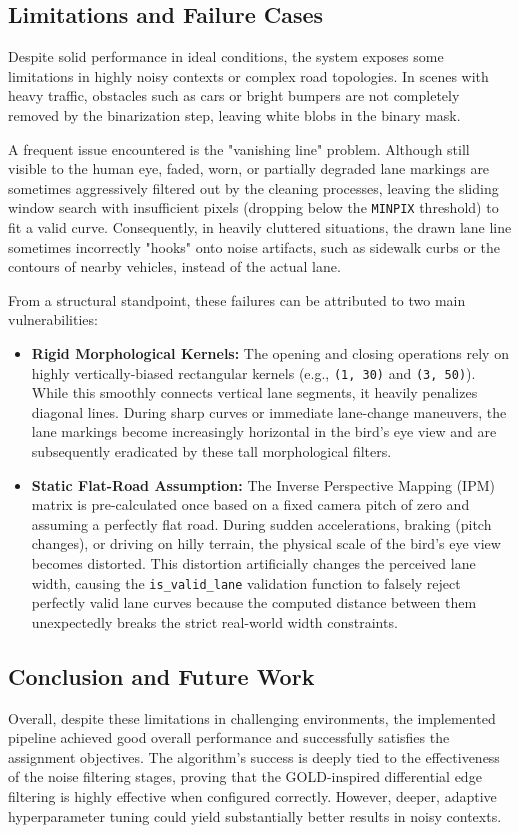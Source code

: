 \documentclass[12pt,a4paper]{article}
\begin{document}
\subsection{Limitations and Failure Cases}
Despite solid performance in ideal conditions, the system exposes some limitations in highly noisy contexts or complex road topologies. In scenes with heavy traffic, obstacles such as cars or bright bumpers are not completely removed by the binarization step, leaving white blobs in the binary mask. 

A frequent issue encountered is the "vanishing line" problem. Although still visible to the human eye, faded, worn, or partially degraded lane markings are sometimes aggressively filtered out by the cleaning processes, leaving the sliding window search with insufficient pixels (dropping below the \texttt{MINPIX} threshold) to fit a valid curve. Consequently, in heavily cluttered situations, the drawn lane line sometimes incorrectly "hooks" onto noise artifacts, such as sidewalk curbs or the contours of nearby vehicles, instead of the actual lane.

From a structural standpoint, these failures can be attributed to two main vulnerabilities:
\begin{itemize}
    \item \textbf{Rigid Morphological Kernels:} The opening and closing operations rely on highly vertically-biased rectangular kernels (e.g., \texttt{(1, 30)} and \texttt{(3, 50)}). While this smoothly connects vertical lane segments, it heavily penalizes diagonal lines. During sharp curves or immediate lane-change maneuvers, the lane markings become increasingly horizontal in the bird's eye view and are subsequently eradicated by these tall morphological filters.
    \item \textbf{Static Flat-Road Assumption:} The Inverse Perspective Mapping (IPM) matrix is pre-calculated once based on a fixed camera pitch of zero and assuming a perfectly flat road. During sudden accelerations, braking (pitch changes), or driving on hilly terrain, the physical scale of the bird's eye view becomes distorted. This distortion artificially changes the perceived lane width, causing the \texttt{is\_valid\_lane} validation function to falsely reject perfectly valid lane curves because the computed distance between them unexpectedly breaks the strict real-world width constraints.
\end{itemize}

\subsection{Conclusion and Future Work}
Overall, despite these limitations in challenging environments, the implemented pipeline achieved good overall performance and successfully satisfies the assignment objectives. The algorithm's success is deeply tied to the effectiveness of the noise filtering stages, proving that the GOLD-inspired differential edge filtering is highly effective when configured correctly. However, deeper, adaptive hyperparameter tuning could yield substantially better results in noisy contexts.
\end{document}

